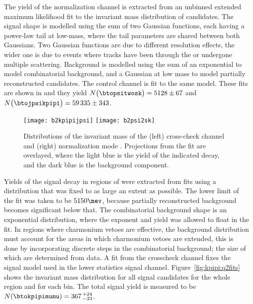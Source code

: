 The yield  of the normalization channel is extracted from an unbinned extended maximum likelihood
fit to the invariant mass distribution of \btopsitwosk candidates.
The signal shape is modelled using the sum of two Gaussian functions, each having a power-law
tail at low-mass, where the tail parameters are shared between both Gaussians.
Two Gaussian functions are due to different resolution effects, the wider one is due to events
where tracks have been through the \ot or undergone multiple scattering.
Background is modelled using the sum of an exponential to model combinatorial background, and a
Gaussian at low mass to model partially reconstructed candidates.
The control channel \btojpsikpipi is fit to the same model.
These fits are shown in  and they yield
$N\big(\btopsitwosk\big)=5128\pm67$ and $N\big(\btojpsikpipi\big)=59\,335\pm343$.

\begin{figure}
  \begin{center}
    \texttt{[image: b2kpipijpsi]}
    \texttt{[image: b2psi2sk]}
    \caption[Fits to \btojpsikpipi and \btopsitwosk candidates]
    {
      Distributions of the invariant mass of the
      (left) cross-check channel \btojpsikpipi and
      (right) normalization mode \btopsitwosk.
      Projections from the fit are overlayed, where the light blue is the yield of the indicated
      decay, and the dark blue is the background component.
    }
    \label{fig:kpipi:norm}
  \end{center}
\end{figure}


Yields of the signal decay in regions of \qsq were extracted from fits using a distribution that
was fixed to as large an extent as possible.
The lower limit of the fit was taken to be $5150\mev$, because partially reconstructed background
becomes significant below that.
The combinatorial background shape is an exponential distribution, where the exponent and yield was
allowed to float in the fit.
In \qsq regions where charmonium vetoes are effective, the background distribution must account for
the areas in which charmonium vetoes are extended, this is done by incorporating discrete steps in
the combinatorial background; the size of which are determined from data.
A fit from the crosscheck channel fixes the signal model used in the lower statistics signal
channel.
Figure~\ref{fig:kpipi:q2fits} shows the invariant mass distribution for all signal
candidates for the whole \qsq region and for each bin.
The total signal yield is measured to be $N(\btokpipimumu)=367\,^{+24}_{-23}$.

